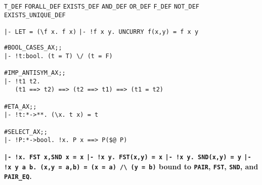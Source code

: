 \vskip5mm
\bspindent\Large\obeylines
\verb!T_DEF!
\verb!FORALL_DEF!
\verb!EXISTS_DEF!
\verb!AND_DEF!
\verb!OR_DEF!
\verb!F_DEF!
\verb!NOT_DEF!
\verb!EXISTS_UNIQUE_DEF!
\espindent


\vskip7mm
\vskip 5mm
\bspindent
\Large\obeylines
  \verb!|- LET = (\f x. f x)!
  \verb+|- !f x y. UNCURRY f(x,y) = f x y+
\espindent
\vskip7mm



\vskip 7mm
\begin{session}\begin{verbatim}
#BOOL_CASES_AX;;
|- !t:bool. (t = T) \/ (t = F)

#IMP_ANTISYM_AX;;
|- !t1 t2. 
   (t1 ==> t2) ==> (t2 ==> t1) ==> (t1 = t2)

#ETA_AX;;
|- !t:*->**. (\x. t x) = t

#SELECT_AX;;
|- !P:*->bool. !x. P x ==> P($@ P)
\end{verbatim}\end{session} 




\vskip7mm
\vskip5mm
\bspindent\Large\bf\obeylines
\verb+|- !x. FST x,SND x = x+
\verb+|- !x y. FST(x,y) = x+
\verb+|- !x y. SND(x,y) = y+
\verb+|- !x y a b. (x,y = a,b) = (x = a) /\ (y = b)+
\espindent
\vskip5mm
\bpindent\LARGE\bf
bound to {\tt PAIR}, {\tt FST}, {\tt SND}, and {\tt PAIR\_EQ}.
\epindent
 
\vskip7mm



\vskip7mm

